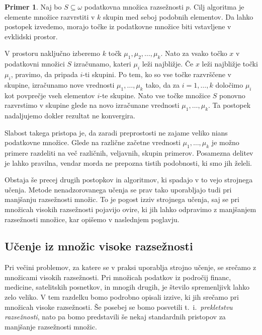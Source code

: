 \documentclass[12pt,a4paper,twoside]{article}
\theoremstyle{definition} %
\newtheorem{primer}[definicija]{Primer}
\theoremstyle{plain} %
\numberwithin{equation}{section}  %
\begin{document}
\begin{primer}
Naj bo $S \subseteq \omega$ podatkovna množica razsežnosti $p$. 
Cilj algoritma je elemente množice razvrstiti v $k$ skupin med seboj podobnih elementov.
Da lahko postopek izvedemo, morajo točke iz podatkovne množice biti vstavljene v evklidski prostor.

V prostoru naključno izberemo $k$ točk $\mu_1, \mu_2, \ldots , \mu_k$. 
Nato za vsako točko $x$ v podatkovni množici $S$ izračunamo, kateri $\mu_i$ leži najbližje. Če $x$ leži najbližje točki $\mu_i$, pravimo, da pripada $i$-ti skupini. 
Po tem, ko so vse točke razvrščene v skupine, izračunamo nove vrednosti $\mu_1, \ldots , \mu_k$ tako, da za $i=1,\ldots,k$ določimo $\mu_i$ kot povprečje vseh elementov $i$-te skupine. 
Nato vse točke množice $S$ ponovno razvrstimo v skupine glede na novo izračunane vrednosti $\mu_1, \ldots, \mu_k$.
Ta postopek nadaljujemo dokler rezultat ne konvergira. 

Slabost takega pristopa je, da zaradi preprostosti ne zajame veliko nians podatkovne množice. 
Glede na različne začetne vrednosti $\mu_1, \ldots, \mu_k$ je možno primere razdeliti na več različnih, veljavnih, skupin primerov. 
Posamezna delitev je lahko pravilna, vendar morda ne prepozna tistih podobnosti, ki smo jih želeli.
\end{primer}


Obstaja še precej drugih postopkov in algoritmov, ki spadajo v to vejo strojnega učenja. 
Metode nenadzorovanega učenja se prav tako uporabljajo tudi pri manjšanju razsežnosti množic. 
To je pogost izziv strojnega učenja, saj se pri množicah visokih razsežnosti pojavijo ovire, ki jih lahko odpravimo z manjšanjem razsežnosti množice, kar opišemo v naslednjem poglavju.



\subsection{Učenje iz množic visoke razsežnosti}

Pri večini problemov, za katere se v praksi uporablja strojno učenje, se srečamo z množicami visokih razsežnosti. 
Pri množicah podatkov iz področij financ, medicine, satelitskih posnetkov, in mnogih drugih, je število spremenljivk lahko zelo veliko. 
V tem razdelku bomo podrobno opisali izzive, ki jih srečamo pri množicah visoke razsežnosti. 
Še posebej se bomo posvetili t.~i.~\emph{prekletstvu razsežnosti}, nato pa bomo predstavili še nekaj standardnih pristopov za manjšanje razsežnosti množic.
\end{document}
